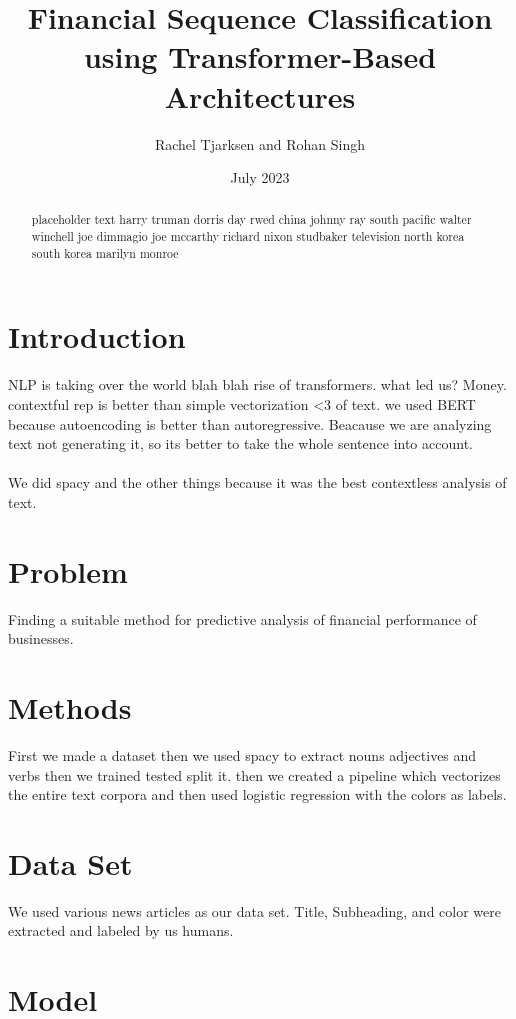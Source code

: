 \documentclass{article}
\title{Financial Sequence Classification using Transformer-Based Architectures}
\author{Rachel Tjarksen and Rohan Singh}
\date{July 2023}
\begin{document}
\maketitle

\begin{abstract}
placeholder text harry truman dorris day rwed china johnny ray south pacific walter winchell joe dimmagio joe mccarthy richard nixon studbaker television north korea south korea marilyn monroe
    
\end{abstract}

\section{Introduction}
NLP is taking over the world blah blah rise of transformers.  what led us? Money. contextful rep is better than simple vectorization <3 of text.  we used BERT because autoencoding is better than autoregressive.  Beacause we are analyzing text not generating it, so its better to take the whole sentence into account.  
\\\\
We did spacy and the other things because it was the best contextless analysis of text.  

\section{Problem}
Finding a suitable method for predictive analysis of financial performance of businesses.  

\section{Methods}
First we made a dataset then we used spacy to extract nouns adjectives and verbs then we trained tested split it.  then we created a pipeline which vectorizes the entire text corpora and then used logistic regression with the colors as labels.

\section{Data Set}
We used various news articles as our data set.  Title, Subheading, and color were extracted and labeled by us humans.  

\section{Model}
\end{document}
